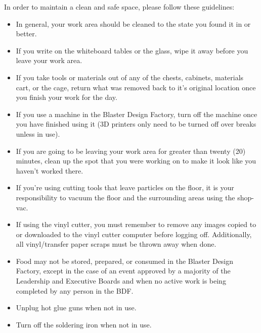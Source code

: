 \documentclass[12pt,letterpaper]{article}
\begin{document}
In order to maintain a clean and safe space, please follow these guidelines:
\begin{itemize}
    \item In general, your work area should be cleaned to the state you found it in or better. 
    \item If you write on the whiteboard tables or the glass, wipe it away before you leave your work area.
    \item If you take tools or materials out of any of the chests, cabinets, materials cart, or the cage, return what was removed back to it’s original location once you finish your work for the day.
    \item If you use a machine in the Blaster Design Factory, turn off the machine once you have finished using it (3D printers only need to be turned off over breaks unless in use).
    \item If you are going to be leaving your work area for greater than twenty (20) minutes, clean up the spot that you were working on to make it look like you haven’t worked there. 
    \item If you’re using cutting tools that leave particles on the floor, it is your responsibility to vacuum the floor and the surrounding areas using the shop-vac.
    \item If using the vinyl cutter, you must remember to remove any images copied to or downloaded to the vinyl cutter computer before logging off. Additionally, all vinyl/transfer paper scraps must be thrown away when done.
    \item Food may not be stored, prepared, or consumed in the Blaster Design Factory, except in the case of an event approved by a majority of the Leadership and Executive Boards and when no active work is being completed by any person in the BDF.
    \item Unplug hot glue guns when not in use.
    \item Turn off the soldering iron when not in use.
\end{itemize}
\end{document}
